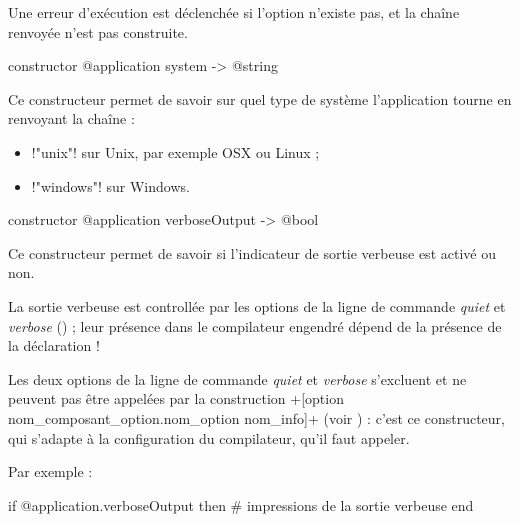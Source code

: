 Une erreur d'exécution est déclenchée si l'option n'existe pas, et la chaîne renvoyée n'est pas construite.








\begin{galgasbox}
constructor @application system -> @string
\end{galgasbox}

Ce constructeur permet de savoir sur quel type de système l'application tourne en renvoyant la chaîne :
\begin{itemize}
  \item \ggs!"unix"! sur Unix, par exemple OSX ou Linux ;
  \item \ggs!"windows"! sur Windows.
\end{itemize}










\begin{galgasbox}
constructor @application verboseOutput -> @bool
\end{galgasbox}

Ce constructeur permet de savoir si l'indicateur de sortie verbeuse est activé ou non.

La sortie verbeuse est controllée par les options de la ligne de commande \emph{quiet} et \emph{verbose} () ; leur présence dans le compilateur engendré dépend de la présence de la déclaration \ggs!%

Les deux options de la ligne de commande \emph{quiet} et \emph{verbose} s'excluent et ne peuvent pas être appelées par la construction \ggs+[option nom_composant_option.nom_option nom_info]+ (voir ) : c'est ce constructeur, qui s'adapte à la configuration du compilateur, qu'il faut appeler.

Par exemple :
\begin{galgas}
if @application.verboseOutput then
  # impressions de la sortie verbeuse
end
\end{galgas}














